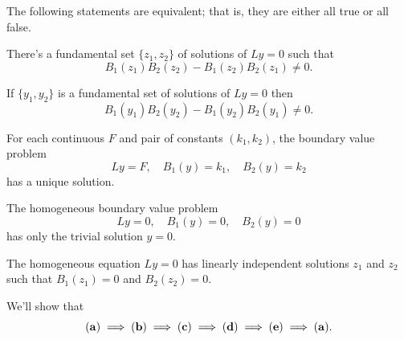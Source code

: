 \begin{theorem}
  \color{blue}
  \label{thmtype:13.1.2} The following statements are equivalent; that is, they are either all true
  or all false.
  \begin{alist}
    \item %
    There's a fundamental set $\{z_{1},z_{2}\}$ of solutions of $Ly=0$ such that
    \begin{equation}
      \label{eq:13.1.8}B_{1}(z_{1})B_{2}(z_{2})-B_{1}(z_{2})B_{2}(z_{1})\ne0.
    \end{equation}

    \item %
    If $\{y_{1},y_{2}\}$ is a fundamental set of solutions of $Ly=0$ then
    \begin{equation}
      \label{eq:13.1.9}B_{1}(y_{1})B_{2}(y_{2})-B_{1}(y_{2})B_{2}(y_{1})\ne0.
    \end{equation}

    \item %
    For each continuous $F$ and pair of constants $(k_{1},k_{2})$, the boundary value problem
    \[
      Ly=F,\quad B_{1}(y)=k_{1},\quad B_{2}(y)=k_{2}
    \]
    has a unique solution.

    \item %
    The homogeneous boundary value problem
    \begin{equation}
      \label{eq:13.1.10}Ly=0,\quad B_{1}(y)=0,\quad B_{2}(y)=0
    \end{equation}
    has only the trivial solution $y=0$.

    \item %
    The homogeneous equation $Ly=0$ has linearly independent solutions $z_{1}$ and $z_{2}$ such that
    $B_{1}(z_{1})=0$ and $B_{2}(z_{2})=0$.
  \end{alist}
\end{theorem}

\proof We'll show that
\[
  {\bf (a)}
  \implies
  {\bf (b)}
  \implies
  {\bf (c)}
  \implies
  {\bf (d)}
  \implies
  {\bf (e)}
  \implies
  {\bf (a)}
  .
\]

